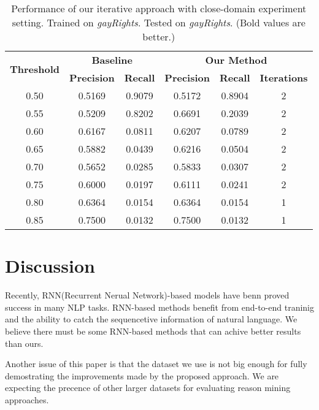 \documentclass[11pt,a4paper]{article}
\begin{document}
\begin{table*}[h]
\begin{center}
\begin{tabular}{|c||c|c|c|c|c|}
\hline
\multicolumn{1}{|c|}{\multirow{2}{*}{\bf Threshold}} & \multicolumn{2}{c|}{\bf Baseline}  & \multicolumn{3}{c|}{\bf Our Method}    \\ \cline{2-6} 
\multicolumn{1}{|c|}{}   & \multicolumn{1}{l|}{\bf Precision} & \multicolumn{1}{l|}{\bf Recall} & \multicolumn{1}{l|}{\bf Precision} & \multicolumn{1}{c|}{\bf Recall} & \multicolumn{1}{l|}{\bf Iterations} \\ \hline
 \hline
0.50 & 0.5169 & 0.9079 & 0.5172 & 0.8904 & 2 \\
0.55 & 0.5209 & 0.8202 & 0.6691 & 0.2039 & 2 \\
0.60 & 0.6167 & 0.0811 & 0.6207 & 0.0789 & 2 \\
0.65 & 0.5882 & 0.0439 & 0.6216 & 0.0504 & 2 \\
0.70 & 0.5652 & 0.0285 & 0.5833 & 0.0307 & 2 \\
0.75 & 0.6000 & 0.0197 & 0.6111 & 0.0241 & 2 \\
0.80 & 0.6364 & 0.0154 & 0.6364 & 0.0154 & 1 \\
0.85 & 0.7500 & 0.0132 & 0.7500 & 0.0132 & 1
\\\hline
\end{tabular}
\end{center}
\caption{\label{tab:same-topic} Performance of our iterative approach with close-domain experiment setting. Trained on {\it gayRights}. Tested on {\it gayRights}. (Bold values are better.)}
\end{table*}




\section{Discussion}
\label{sec:discussion}

Recently, RNN(Recurrent Nerual Network)-based models have benn proved success in many NLP tasks\cite{mikolov2010recurrent,luong2015effective}. RNN-based methods benefit from end-to-end traninig and the ability to catch the sequencetive information of natural language. We believe there must be some RNN-based methods that can achive better results than ours. 

Another issue of this paper is that the dataset we use is not big enough for fully demostrating the improvements made by the proposed approach. We are expecting the precence of other larger datasets for evaluating reason mining approaches.
\end{document}
